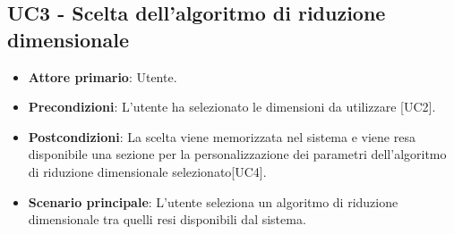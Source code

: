 \subsection{UC3 - Scelta dell'algoritmo di riduzione dimensionale}
\begin{itemize}
	\item \textbf{Attore primario}: Utente.
	\item \textbf{Precondizioni}: L'utente ha selezionato le dimensioni da utilizzare [UC2].
	\item \textbf{Postcondizioni}: La scelta viene memorizzata nel sistema e viene resa disponibile una sezione per la personalizzazione dei parametri dell'algoritmo di riduzione dimensionale selezionato[UC4].
	\item \textbf{Scenario principale}: L'utente seleziona un algoritmo di riduzione dimensionale tra quelli resi disponibili dal sistema.
\end{itemize}